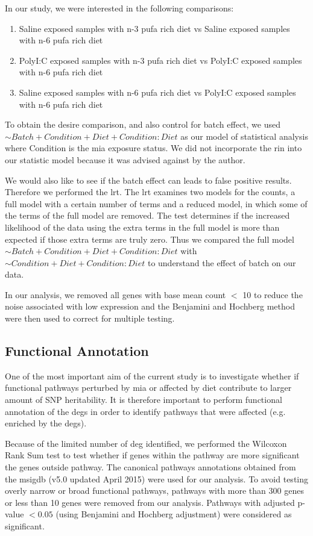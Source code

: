 In our study, we were interested in the following comparisons:
\begin{enumerate}
	\item Saline exposed samples with n-3 \gls{pufa} rich diet vs Saline exposed samples with n-6 \gls{pufa} rich diet 
	\item PolyI:C exposed samples with n-3 \gls{pufa} rich diet vs PolyI:C exposed samples with n-6 \gls{pufa} rich diet 
	\item Saline exposed samples with n-6 \gls{pufa} rich diet vs PolyI:C exposed samples with n-6 \gls{pufa} rich diet 
\end{enumerate}
To obtain the desire comparison, and also control for batch effect, we used $\sim Batch+Condition+Diet+Condition:Diet$ as our model of statistical analysis where Condition is the \gls{mia} exposure status.
We did not incorporate the \gls{rin} into our statistic model because it was advised against by the author.

We would also like to see if the batch effect can leads to false positive results.
Therefore we performed the \gls{lrt}.
The \gls{lrt} examines two models for the counts, a full model with a certain number of terms and a reduced model, in which some of the terms of the full model are removed. 
The test determines if the increased likelihood of the data using the extra terms in the full model is more than expected if those extra terms are truly zero.
Thus we compared the full model $\sim Batch+Condition+Diet+Condition:Diet$ with $\sim Condition+Diet+Condition:Diet$ to understand the effect of batch on our data.

In our analysis, we removed all genes with base mean count $<$ 10  to reduce the noise associated with low expression and the Benjamini and Hochberg method were then used to correct for multiple testing.

\subsection{Functional Annotation}
\label{sec:function}
One of the most important aim of the current study is to investigate whether if functional pathways perturbed by \gls{mia} or affected by diet contribute to larger amount of \gls{SNP} heritability.
It is therefore important to perform functional annotation of the \glspl{deg} in order to identify pathways that were affected (e.g. enriched by the \glspl{deg}).

Because of the limited number of \gls{deg} identified, we performed the Wilcoxon Rank Sum test to test whether if genes within the pathway are more significant the genes outside pathway.
The canonical pathways annotations obtained from the \gls{msigdb} (v5.0 updated April 2015) \citep{Subramanian2005} were used for our analysis.
To avoid testing overly narrow or broad functional pathways, pathways with more than 300 genes or less than 10 genes were removed from our analysis. 
Pathways with adjusted p-value $<0.05$ (using Benjamini and Hochberg adjustment) were considered as significant.

